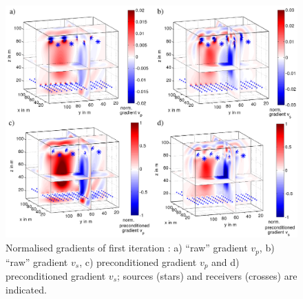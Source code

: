 \begin{figure}[h!]
\begin{center}
\includegraphics[width=\textwidth]{fig_toy/grad_toy}
\caption[Toy example - gradient before and after preconditioning]{Normalised gradients of first iteration : a) ``raw'' gradient $v_p$, b) ``raw'' gradient $v_s$, c) preconditioned gradient $v_p$ and d) preconditioned gradient $v_s$; sources (stars) and receivers (crosses) are indicated. }\label{fig:toy_grad}
\end{center}
\end{figure}
